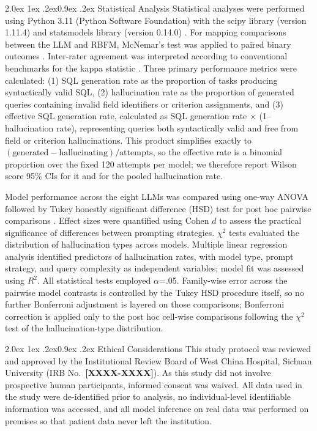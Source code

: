 \documentclass[10pt]{article}
\makeatletter
\renewcommand\subsection{\@startsection{subsection}{2}{\z@}%
  {2.0ex \@plus 1ex \@minus .2ex}{0.9ex \@plus .2ex}%
  {\normalfont\normalsize\bfseries}}
\newcommand{\PH}[1]{{\color{red}\textbf{[#1]}}}
\makeatother
\begin{document}
\subsection{Statistical Analysis}
Statistical analyses were performed using Python 3.11 (Python Software
Foundation) with the scipy library (version 1.11.4) \cite{scipy2020} and
statsmodels library (version 0.14.0) \cite{statsmodels2010}. For mapping
comparisons between the LLM and RBFM, McNemar's test was applied to paired binary
outcomes \cite{mcnemar1947}. Inter-rater agreement was interpreted according to
conventional benchmarks for the kappa statistic \cite{landis1977}. Three primary performance
metrics were calculated: (1) SQL generation rate as the proportion of tasks
producing syntactically valid SQL, (2) hallucination rate as the proportion of
generated queries containing invalid field identifiers or criterion assignments,
and (3) effective SQL generation rate, calculated as SQL generation rate $\times$ (1--hallucination rate), representing queries both syntactically valid and free from field or criterion hallucinations. This product simplifies exactly to $(\text{generated}-\text{hallucinating})/\text{attempts}$, so the effective rate is a binomial proportion over the fixed 120 attempts per model; we therefore report Wilson score 95\% CIs for it and for the pooled hallucination rate.

Model performance across the eight LLMs was compared using one-way ANOVA
followed by Tukey honestly significant difference (HSD) test for post hoc
pairwise comparisons \cite{tukey1949}. Effect sizes were quantified using Cohen $d$ to assess the
practical significance of differences between prompting strategies. $\chi^2$
tests evaluated the distribution of hallucination types across models. Multiple
linear regression analysis identified predictors of hallucination rates, with
model type, prompt strategy, and query complexity as independent variables;
model fit was assessed using $R^2$. All statistical tests employed $\alpha$=.05. Family-wise error across the pairwise model contrasts is controlled by the Tukey HSD procedure itself, so no further Bonferroni adjustment is layered on those comparisons; Bonferroni correction is applied only to the post hoc cell-wise comparisons following the $\chi^2$ test of the hallucination-type distribution.

\subsection{Ethical Considerations}
This study protocol was reviewed and approved by the Institutional Review Board
of West China Hospital, Sichuan University (IRB No.\ \PH{XXXX-XXXX}). As this study did not involve
prospective human participants, informed consent was waived. All data used in
the study were de-identified prior to analysis, no individual-level identifiable
information was accessed, and all model inference on real data was performed on
premises so that patient data never left the institution.
\end{document}
